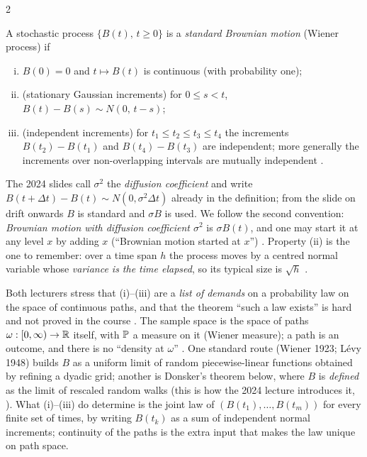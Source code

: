 \begin{paracol}{2}
\begin{definition}\label{ch11:def-bm}
A stochastic process $\{B(t),\,t\ge0\}$ is a \emph{standard Brownian motion} (Wiener process) if
\begin{enumerate}[(i)]
  \item $B(0)=0$ and $t\mapsto B(t)$ is continuous (with probability one);
  \item (stationary Gaussian increments) for $0\le s<t$, $B(t)-B(s)\sim N(0,\,t-s)$;
  \item (independent increments) for $t_1\le t_2\le t_3\le t_4$ the increments $B(t_2)-B(t_1)$ and $B(t_4)-B(t_3)$ are
        independent; more generally the increments over non-overlapping intervals are mutually independent
        .
\end{enumerate}
\end{definition}

The 2024 slides call $\sigma^2$ the \emph{diffusion coefficient} and write $B(t+\Delta t)-B(t)\sim N(0,\sigma^2\Delta t)$
already in the definition; from the slide on drift onwards $B$ is standard and $\sigma B$ is used. We follow the second convention:
\emph{Brownian motion with diffusion coefficient $\sigma^2$} is $\sigma B(t)$, and one may start it at any level $x$ by
adding $x$ (``Brownian motion started at $x$'') . Property (ii) is the one to remember: over a time span
$h$ the process moves by a centred normal variable whose \emph{variance is the time elapsed}, so its typical size is
$\sqrt h$ .

\begin{coursenote}
Both lecturers stress that (i)--(iii) are a \emph{list of demands} on a probability law on the space of continuous
paths, and that the theorem ``such a law exists'' is hard and not proved in the course .
The sample space is the space of paths $\omega:[0,\infty)\to\mathbb{R}$ itself, with $\mathbb{P}$ a measure on it (Wiener measure); a
path is an outcome, and there is no ``density at $\omega$'' . One standard route (Wiener 1923; L\'evy 1948)
builds $B$ as a uniform limit of random piecewise-linear functions obtained by refining a dyadic grid; another is
Donsker's theorem below, where $B$ is \emph{defined} as the limit of rescaled random walks (this is how the 2024 lecture
introduces it, ). What (i)--(iii) do determine is the joint law of $(B(t_1),\dots,B(t_m))$ for every finite
set of times, by writing $B(t_k)$ as a sum of independent normal increments; continuity of the paths is the extra input
that makes the law unique on path space.
\end{coursenote}


\end{paracol}
